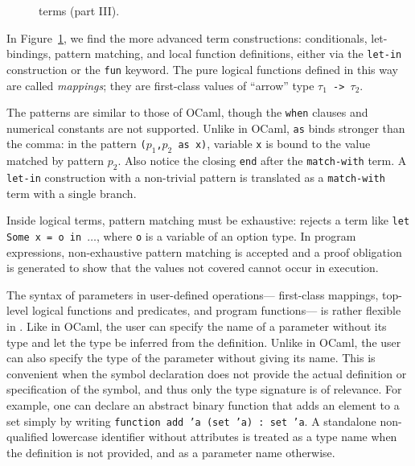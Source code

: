 \begin{figure}[ht]
\begin{center}\end{center}
\caption{\whyml terms (part III).}
\label{fig:bnf:term3}
\end{figure}

In Figure~\ref{fig:bnf:term3}, we find the more advanced
term constructions: conditionals, let-bindings, pattern
matching, and local function definitions,
either via the \texttt{let-in} construction or the
\texttt{fun} keyword. The pure logical functions
defined in this way are called \emph{mappings};
they are first-class values of ``arrow'' type
\texttt{$\tau_1$ -> $\tau_2$}.

The patterns are similar to those of OCaml, though the \texttt{when}
clauses and numerical constants are not supported. Unlike in OCaml,
\texttt{as} binds stronger than the comma: in the pattern
\texttt{($p_1$,$p_2$ as x)}, variable \texttt{x} is bound to
the value matched by pattern $p_2$. Also notice the closing
\texttt{end} after the \texttt{match-with} term.
A \texttt{let-in} construction with a non-trivial pattern is
translated as a \texttt{match-with} term with a single branch.

Inside logical terms, pattern matching must be exhaustive:
\whyml rejects a term like \texttt{let Some x = o in $\dots$},
where \texttt{o} is a variable of an option type.
In program expressions, non-exhaustive pattern matching
is accepted and a proof obligation is generated to show
that the values not covered cannot occur in execution.

The syntax of parameters %
in user-defined operations---%
first-class mappings,
top-level logical functions and predicates,
and program functions---%
is rather flexible in \whyml.
Like in OCaml, the user can specify the name of a parameter
without its type and let the type be inferred from the
definition. Unlike in OCaml, the user can also specify
the type of the parameter without giving its name.
This is convenient when the symbol declaration does not
provide the actual definition or specification of
the symbol, and thus only the type signature is of
relevance.
For example, one can declare an abstract binary function
that adds an element to a set simply by writing
\texttt{function add 'a (set 'a) : set 'a}.
A standalone non-qualified lowercase identifier without
attributes is treated as a type name when the definition
is not provided, and as a parameter name otherwise.

